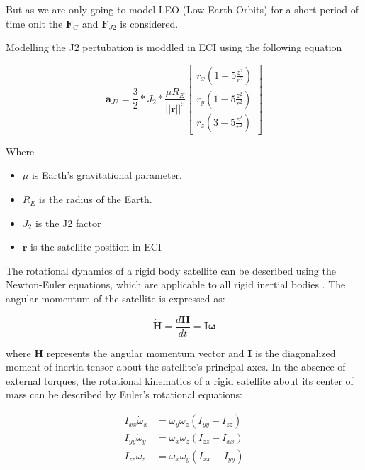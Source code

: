 But as we are only going to model LEO (Low Earth Orbits) for a short period of time onlt the $\mathbf{F}_{G}$ and $\mathbf{F}_{J2}$ is considered.

Modelling the J2 pertubation is moddled in ECI using the following equation

\begin{equation}
\mathbf{a}_{J2} = \frac{3}{2}*J_2*\frac{\mu R_E}{||\mathbf{r}||^5}
\begin{bmatrix}r_x(1-5\frac{z^2}{r^2}) \\
 r_y(1-5\frac{z^2}{r^2})\\
 r_z(3-5\frac{z^2}{r^2}) \end{bmatrix}
\end{equation}


Where 

\begin{itemize}
    \item $\mu$ is Earth's gravitational parameter.
    \item $R_E$ is the radius of the Earth.
    \item $J_2$ is the J2 factor
    \item $\mathbf{r}$ is the satellite position in ECI
\end{itemize}


The rotational dynamics of a rigid body satellite can be described using the Newton-Euler equations, 
which are applicable to all rigid inertial bodies . The angular momentum of the satellite is expressed as:

\begin{equation}
\dot{\mathbf{H}} = \frac{d\mathbf{H}}{dt} = \mathbf{I}\dot{\boldsymbol{\omega}}
\end{equation}

\noindent where $\mathbf{H}$ represents the angular momentum vector and $\mathbf{I}$ is the diagonalized moment of 
inertia tensor about the satellite's principal axes. In the absence of external torques, the rotational kinematics 
of a rigid satellite about its center of mass can be described by Euler's rotational equations:

\begin{align}
I_{xx}\dot{\omega}_x &= \omega_y\omega_z(I_{yy} - I_{zz}) \\
I_{yy}\dot{\omega}_y &= \omega_x\omega_z(I_{zz} - I_{xx}) \\
I_{zz}\dot{\omega}_z &= \omega_x\omega_y(I_{xx} - I_{yy})
\end{align}

